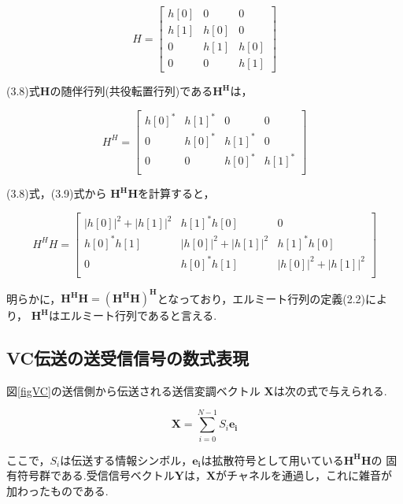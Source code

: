\begin{equation}
    H = \left[
        \begin{array}{ccc}
            h[0] & 0 & 0 \\
            h[1] & h[0] & 0 \\
            0 & h[1] & h[0] \\
            0 & 0 & h[1]
        \end{array}
    \right]
\end{equation}

(3.8)式$\bm{H}$の随伴行列(共役転置行列)である$\bm{H^H}$は，

\begin{equation}
    H^H = \left[
        \begin{array}{cccc}
            h[0]^* & h[1]^* & 0 & 0 \\
            0 & h[0]^* & h[1]^* & 0 \\
            0 & 0 & h[0]^* & h[1]^* \\
        \end{array}
    \right]
\end{equation}

(3.8)式，(3.9)式から $\bm{H^HH}$を計算すると，

\begin{equation}
    H^HH = \left[
        \begin{array}{ccc}
            |h[0]|^2+|h[1]|^2 & h[1]^*h[0] & 0 \\
            h[0]^*h[1] & |h[0]|^2+|h[1]|^2 & h[1]^*h[0] \\
            0 & h[0]^*h[1] & |h[0]|^2+|h[1]|^2 \\
        \end{array}
    \right]
\end{equation}

明らかに，$\bm{H^HH=(H^HH)^H}$となっており，エルミート行列の定義(2.2)により，
$\bm{H^H}$はエルミート行列であると言える.

\subsection{VC伝送の送受信信号の数式表現}
図\ref{figVC}の送信側から伝送される送信変調ベクトル
$\bm{X}$は次の式で与えられる.

\begin{equation}
    \bm{X} = \sum_{i=0}^{N-1} S_i\bm{e_i}
\end{equation}

ここで，$S_i$は伝送する情報シンボル，$\bm{e_i}$は拡散符号として用いている$\bm{H^HH}$の
固有符号群である.受信信号ベクトル$\bm{Y}$は，$\bm{X}$がチャネルを通過し，これに雑音が
加わったものである.

